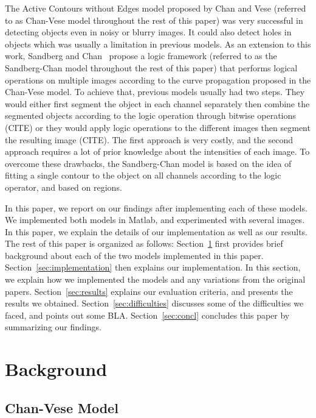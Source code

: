 \documentclass[10pt,journal,letterpaper,compsoc]{IEEEtran}
\begin{document}
The Active Contours without Edges model proposed by Chan and Vese (referred to as Chan-Vese model throughout the rest of this paper) was very successful in
detecting objects even in noisy or blurry images. It could also detect holes in objects which was usually a limitation in previous models. As an extension to
this work, Sandberg and Chan~\cite{sandberg2005logic} propose a logic framework (referred to as the Sandberg-Chan model throughout the rest of this
paper) that  performs logical operations on multiple images according to the curve propagation proposed in the Chan-Vese model. To achieve that, previous models
usually had two steps. They would either first segment the object in each channel separately then combine the segmented objects according to the logic operation
through bitwise operations (CITE) or they would apply logic operations to the different images then segment the resulting image (CITE). The first approach is
very costly, and the second approach requires a lot of prior knowledge about the intensities of each image. To overcome these drawbacks, the Sandberg-Chan
model is based on the idea of fitting a single contour to the object on all channels according to the logic operator, and based on regions.

In this paper, we report on our findings after implementing each of these models. We implemented both models in Matlab, and experimented with several images.
In this paper, we explain the details of our implementation as well as our results. The rest of this paper is organized as follows: Section~\ref{sec:bg} first
provides brief background about each of the two models implemented in this paper. Section~\ref{sec:implementation} then explains our implementation. In this
section, we explain how we implemented the models and any variations from the original papers. Section~\ref{sec:results} explains our evaluation criteria, and
presents the results we obtained. Section~\ref{sec:difficulties} discusses some of the difficulties we faced, and points out some BLA. Section~\ref{sec:concl}
concludes this paper by summarizing our findings.


\section{Background}
\label{sec:bg}

\subsection{Chan-Vese Model}
\label{sec:chan-vese}
\end{document}
